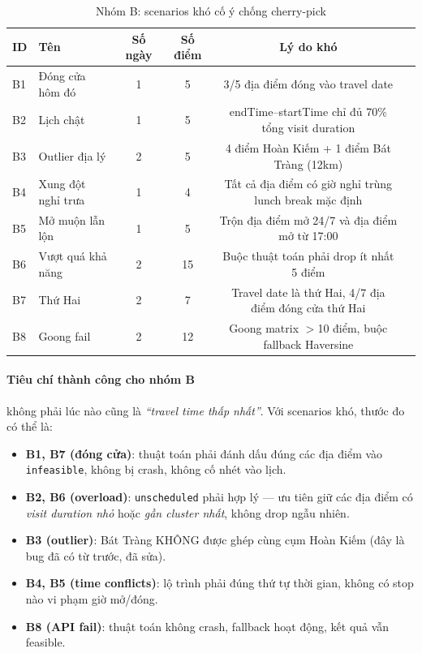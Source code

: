 \documentclass[12pt,a4paper]{report}
\begin{document}
\begin{table}[H]
\centering
\caption{Nhóm B: scenarios khó cố ý chống cherry-pick}
\begin{tabular}{llcccp{5cm}}
\toprule
\textbf{ID} & \textbf{Tên} & \textbf{Số ngày} & \textbf{Số điểm} & \textbf{Lý do khó} \\
\midrule
B1 & Đóng cửa hôm đó    & 1 & 5 & 3/5 địa điểm đóng vào travel date \\
B2 & Lịch chật          & 1 & 5 & endTime--startTime chỉ đủ 70\% tổng visit duration \\
B3 & Outlier địa lý     & 2 & 5 & 4 điểm Hoàn Kiếm + 1 điểm Bát Tràng (12km) \\
B4 & Xung đột nghỉ trưa & 1 & 4 & Tất cả địa điểm có giờ nghỉ trùng lunch break mặc định \\
B5 & Mở muộn lẫn lộn    & 1 & 5 & Trộn địa điểm mở 24/7 và địa điểm mở từ 17:00 \\
B6 & Vượt quá khả năng  & 2 & 15 & Buộc thuật toán phải drop ít nhất 5 điểm \\
B7 & Thứ Hai            & 2 & 7 & Travel date là thứ Hai, 4/7 địa điểm đóng cửa thứ Hai \\
B8 & Goong fail         & 2 & 12 & Goong matrix $>$10 điểm, buộc fallback Haversine \\
\bottomrule
\end{tabular}
\end{table}

\paragraph{Tiêu chí thành công cho nhóm B} không phải lúc nào cũng là \textit{``travel time thấp nhất''}. Với scenarios khó, thước đo có thể là:

\begin{itemize}[leftmargin=*]
    \item \textbf{B1, B7 (đóng cửa)}: thuật toán phải đánh dấu đúng các địa điểm vào \texttt{infeasible}, không bị crash, không cố nhét vào lịch.
    \item \textbf{B2, B6 (overload)}: \texttt{unscheduled} phải hợp lý --- ưu tiên giữ các địa điểm có \textit{visit duration nhỏ} hoặc \textit{gần cluster nhất}, không drop ngẫu nhiên.
    \item \textbf{B3 (outlier)}: Bát Tràng KHÔNG được ghép cùng cụm Hoàn Kiếm (đây là bug đã có từ trước, đã sửa).
    \item \textbf{B4, B5 (time conflicts)}: lộ trình phải đúng thứ tự thời gian, không có stop nào vi phạm giờ mở/đóng.
    \item \textbf{B8 (API fail)}: thuật toán không crash, fallback hoạt động, kết quả vẫn feasible.
\end{itemize}
\end{document}
